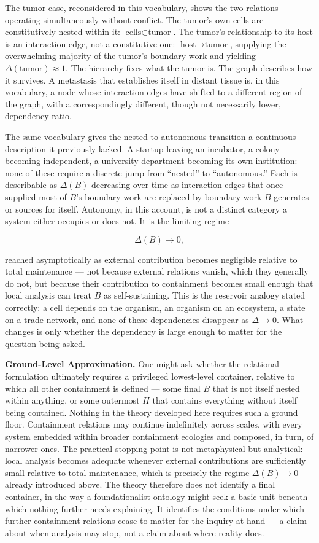 \documentclass[11pt]{article}
\theoremstyle{plain}
\begin{document}
The tumor case, reconsidered in this vocabulary, shows the two relations operating simultaneously without conflict. The tumor's own cells are constitutively nested within it: \(\text{cells} \subset \text{tumor}\). The tumor's relationship to its host is an interaction edge, not a constitutive one: \(\text{host} \to \text{tumor}\), supplying the overwhelming majority of the tumor's boundary work and yielding \(\Delta(\text{tumor}) \approx 1\). The hierarchy fixes what the tumor is. The graph describes how it survives. A metastasis that establishes itself in distant tissue is, in this vocabulary, a node whose interaction edges have shifted to a different region of the graph, with a correspondingly different, though not necessarily lower, dependency ratio.

The same vocabulary gives the nested-to-autonomous transition a continuous description it previously lacked. A startup leaving an incubator, a colony becoming independent, a university department becoming its own institution: none of these require a discrete jump from ``nested'' to ``autonomous.'' Each is describable as \(\Delta(B)\) decreasing over time as interaction edges that once supplied most of \(B\)'s boundary work are replaced by boundary work \(B\) generates or sources for itself. Autonomy, in this account, is not a distinct category a system either occupies or does not. It is the limiting regime

\[\Delta(B) \to 0,\]

reached asymptotically as external contribution becomes negligible relative to total maintenance --- not because external relations vanish, which they generally do not, but because their contribution to containment becomes small enough that local analysis can treat \(B\) as self-sustaining. This is the reservoir analogy stated correctly: a cell depends on the organism, an organism on an ecosystem, a state on a trade network, and none of these dependencies disappear as \(\Delta \to 0\). What changes is only whether the dependency is large enough to matter for the question being asked.

\textbf{Ground-Level Approximation.} One might ask whether the relational formulation ultimately requires a privileged lowest-level container, relative to which all other containment is defined --- some final \(B\) that is not itself nested within anything, or some outermost \(H\) that contains everything without itself being contained. Nothing in the theory developed here requires such a ground floor. Containment relations may continue indefinitely across scales, with every system embedded within broader containment ecologies and composed, in turn, of narrower ones. The practical stopping point is not metaphysical but analytical: local analysis becomes adequate whenever external contributions are sufficiently small relative to total maintenance, which is precisely the regime \(\Delta(B) \to 0\) already introduced above. The theory therefore does not identify a final container, in the way a foundationalist ontology might seek a basic unit beneath which nothing further needs explaining. It identifies the conditions under which further containment relations cease to matter for the inquiry at hand --- a claim about when analysis may stop, not a claim about where reality does.
\end{document}
